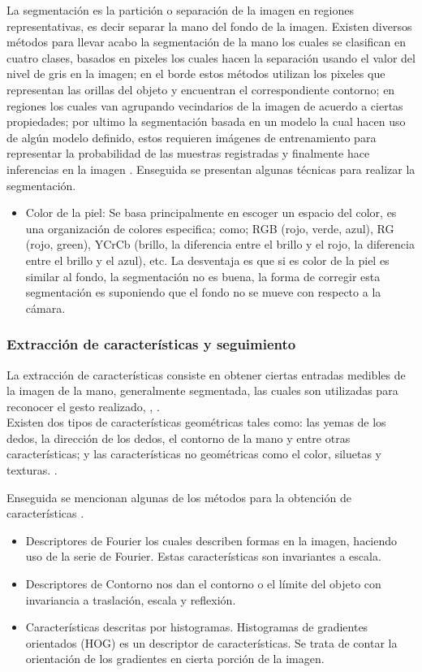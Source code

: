 La segmentación es la partición o separación de la imagen en regiones representativas, es decir separar la mano del fondo de la imagen. Existen diversos métodos para llevar acabo la segmentación de la mano los cuales se clasifican en cuatro clases, basados en pixeles los cuales hacen la separación usando el valor del nivel de gris en la imagen; en el borde estos métodos utilizan los pixeles que representan las orillas del objeto y encuentran el correspondiente contorno; en regiones los cuales van agrupando vecindarios de la imagen de acuerdo a ciertas propiedades; por ultimo la segmentación basada en un modelo la cual hacen uso de algún modelo definido, estos requieren imágenes de entrenamiento para representar la probabilidad de las muestras registradas y finalmente hace inferencias en la imagen \citep{Ibraheem2013}.
Enseguida se presentan algunas técnicas para realizar la segmentación.
\begin{itemize}
\item Color de la piel: Se basa principalmente en escoger un espacio del color, es una organización de colores especifica; como; RGB (rojo, verde, azul), RG (rojo, green), YCrCb (brillo, la diferencia entre el brillo y el rojo, la diferencia entre el brillo y el azul), etc. La desventaja es que si es color de la piel es similar al fondo, la segmentación no es buena, la forma de corregir esta segmentación es suponiendo que el fondo no se mueve con respecto a la cámara.
\end{itemize}

\subsubsection{Extracción de características y seguimiento}\label{sssec:EtapaSeguimiento}  

La extracción de características consiste en obtener ciertas entradas medibles de la imagen de la mano, generalmente segmentada, las cuales son utilizadas para reconocer el gesto realizado, \citep{Premaratne2013}, \citep{Nayakwadi2014}.\\
Existen dos tipos de características geométricas tales como: las yemas de los dedos, la dirección de los dedos, el contorno de la mano y entre otras características; y las características no geométricas como el color, siluetas y texturas. \citep{Murthy2009}. 

Enseguida se mencionan algunas de los métodos para la obtención de características \citep{Premaratne2013}. 
\begin{itemize}
\item Descriptores de Fourier los cuales describen formas en la imagen, haciendo uso de la serie de Fourier. Estas características son invariantes a escala.
\item Descriptores de Contorno nos dan el contorno  o el límite del objeto con invariancia a traslación, escala  y reflexión.     
\item Características descritas por histogramas. Histogramas de gradientes orientados (HOG) es un descriptor de características. Se trata de contar la orientación de los gradientes en cierta porción de la imagen.  
\end{itemize}




